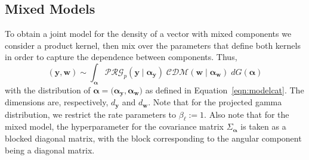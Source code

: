 \subsection{Mixed Models}
To obtain a joint model for the density of a vector with mixed components
    we consider a product kernel, then mix over the parameters that define 
    both kernels in order to capture the dependence between components. Thus,
    \begin{equation}
        \label{model:mixed}
        (\bm{y},\bm{w})\sim \int_{\bm{\alpha}}\mathcal{PRG}_{p}
            (\bm{y}\mid\bm{\alpha}_{\bm{y}})
        \;\mathcal{CDM}(\bm{w}\mid\bm{\alpha}_{\bm{w}})\;dG(\bm{\alpha})
    \end{equation}
  with the distribution of $\bm{\alpha}=(\bm{\alpha_\bm{y},\bm{\alpha_\bm{w}})}$ as
    defined in Equation~\ref{eqn:modelcat}. The dimensions are, respectively, 
    $d_{\bm{y}}$ and $d_{\bm{w}}$. Note that for 
    the projected gamma distribution, we restrict the rate parameters 
    to $\beta_{\ell} := 1$.  Also note that for the mixed model, the hyperparameter 
    for the covariance matrix $\Sigma_{\bm{\alpha}}$ is taken as a blocked diagonal 
    matrix, with the block corresponding to the angular component being a 
    diagonal matrix.

